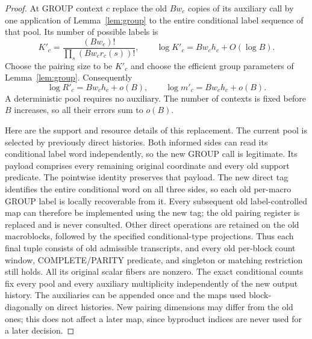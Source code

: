 \documentclass[11pt]{article}
\numberwithin{equation}{section}
\theoremstyle{definition}
\theoremstyle{remark}
\begin{document}
\begin{proof}
At GROUP context $c$ replace the old $Bw_c$ copies of its auxiliary call by
one application of Lemma~\ref{lem:group} to the entire conditional label
sequence of that pool.  Its number of possible labels is
\[
 K'_c=\frac{(Bw_c)!}
           {\prod_s(Bw_cr_c(s))!},
 \qquad
 \log K'_c=Bw_ch_c+O(\log B).
\]
Choose the pairing size to be $K'_c$ and choose the efficient group parameters
of Lemma~\ref{lem:group}.  Consequently
\begin{equation}
 \log R'_c=Bw_ch_c+o(B),\qquad
 \log m'_c=Bw_ch_c+o(B).
\label{val:new-group-rates}
\end{equation}
A deterministic pool requires no auxiliary.  The number of contexts is
fixed before $B$ increases, so all their errors sum to $o(B)$.

Here are the support and resource details of this replacement.  The current
pool is selected by previously direct histories.  Both informed sides can
read its conditional label word independently, so the new GROUP call is
legitimate.  Its payload comprises every remaining original coordinate and
every old support predicate.  The pointwise identity preserves that payload.
The new direct tag identifies the entire conditional word on all three sides,
so each old per-macro GROUP label is locally recoverable from it.  Every
subsequent old label-controlled map can therefore be implemented using the
new tag; the old pairing register is replaced and is never consulted.
Other direct operations are retained on the old macroblocks, followed by the
specified conditional-type projections.  Thus each final tuple consists of
old admissible transcripts, and every old per-block count window,
COMPLETE/PARITY predicate, and singleton or matching restriction still holds.
All its original scalar fibers are nonzero.  The exact conditional counts
fix every pool and every auxiliary multiplicity independently of the new
output history.  The auxiliaries can be appended once and the maps used
block-diagonally on direct histories.  New pairing dimensions may differ
from the old ones; this does not affect a later map, since byproduct indices
are never used for a later decision.


\end{proof}
\end{document}
